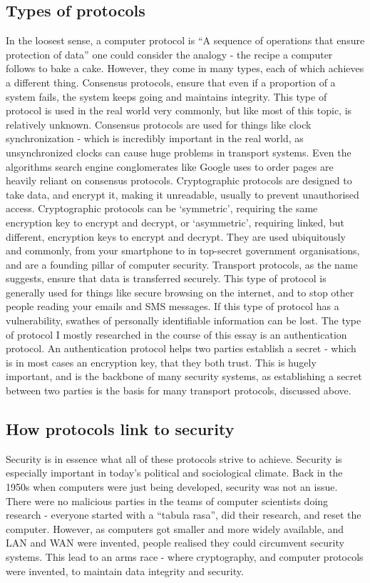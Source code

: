 \documentclass{article}
\begin{document}
\subsection{Types of protocols}
In the loosest sense, a computer protocol is “A sequence of operations that
ensure protection of data”  one could consider the analogy - the recipe a
computer follows to bake a cake. However, they come in many types, each of which
achieves a different thing. Consensus protocols, ensure that even if a
proportion of a system fails, the system keeps going and maintains integrity.
This type of protocol is used in the real world very commonly, but like most of
this topic, is relatively unknown. Consensus protocols are used for things like
clock synchronization - which is incredibly important in the real world, as
unsynchronized clocks can cause huge problems in transport systems. Even the
algorithms search engine conglomerates like Google uses to order pages are
heavily reliant on consensus protocols. Cryptographic protocols are designed to
take data, and encrypt it, making it unreadable, usually to prevent unauthorised
access. Cryptographic protocols can be ‘symmetric’, requiring the same
encryption key to encrypt and decrypt, or ‘asymmetric’, requiring linked, but
different, encryption keys to encrypt and decrypt. They are used ubiquitously
and commonly, from your smartphone to in top-secret government organisations,
and are a founding pillar of computer security. Transport protocols, as the name
suggests, ensure that data is transferred securely. This type of protocol is
generally used for things like secure browsing on the internet, and to stop
other people reading your emails and SMS messages. If this type of protocol has
a vulnerability, swathes of personally identifiable information can be lost. The
type of protocol I mostly researched in the course of this essay is an
authentication protocol. An authentication protocol helps two parties establish
a secret - which is in most cases an encryption key, that they both trust. This
is hugely important, and is the backbone of many security systems, as
establishing a secret between two parties is the basis for many transport
protocols, discussed above.

\subsection{How protocols link to security}
Security is in essence what all of these protocols strive to achieve. Security
is especially important in today’s political and sociological climate. Back in
the 1950s when computers were just being developed, security was not an issue.
There were no malicious parties in the teams of computer scientists doing
research - everyone started with a “tabula rasa”, did their research, and reset
the computer. However, as computers got smaller and more widely available, and
LAN and WAN were invented, people realised they could circumvent security
systems. This lead to an arms race - where cryptography, and computer protocols
were invented, to maintain data integrity and security.
\end{document}
